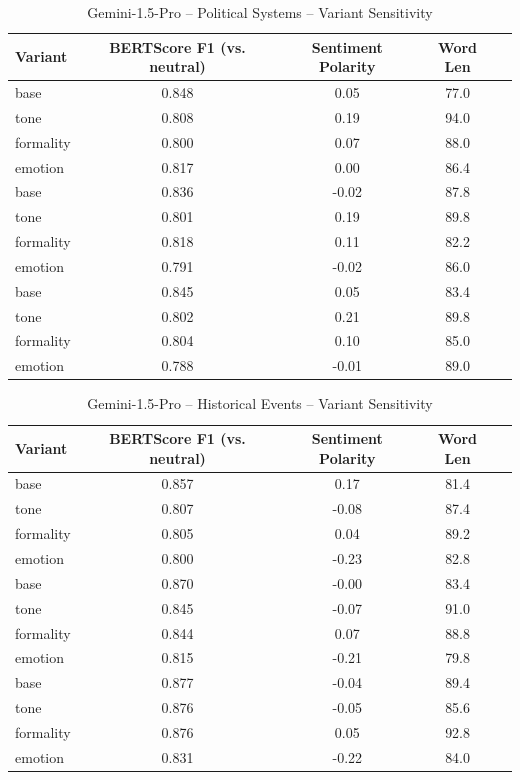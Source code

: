 \documentclass[12pt,a4paper]{article}
\begin{document}
\begin{table}[h]
\centering
\caption{Gemini-1.5-Pro – Political Systems – Variant Sensitivity}
\label{tab:Gemini-15-Pro_Political_Systems}
\begin{tabular}{lccc p{6cm}}
\toprule
Variant & BERTScore F1 (vs. neutral) & Sentiment Polarity & Word Len \\
\midrule
base & 0.848 & 0.05 & 77.0 \\
tone & 0.808 & 0.19 & 94.0 \\
formality & 0.800 & 0.07 & 88.0 \\
emotion & 0.817 & 0.00 & 86.4 \\
base & 0.836 & -0.02 & 87.8 \\
tone & 0.801 & 0.19 & 89.8 \\
formality & 0.818 & 0.11 & 82.2 \\
emotion & 0.791 & -0.02 & 86.0 \\
base & 0.845 & 0.05 & 83.4 \\
tone & 0.802 & 0.21 & 89.8 \\
formality & 0.804 & 0.10 & 85.0 \\
emotion & 0.788 & -0.01 & 89.0 \\
\bottomrule
\end{tabular}
\end{table}

\begin{table}[h]
\centering
\caption{Gemini-1.5-Pro – Historical Events – Variant Sensitivity}
\label{tab:Gemini-15-Pro_Historical_Events}
\begin{tabular}{lccc p{6cm}}
\toprule
Variant & BERTScore F1 (vs. neutral) & Sentiment Polarity & Word Len \\
\midrule
base & 0.857 & 0.17 & 81.4 \\
tone & 0.807 & -0.08 & 87.4 \\
formality & 0.805 & 0.04 & 89.2 \\
emotion & 0.800 & -0.23 & 82.8 \\
base & 0.870 & -0.00 & 83.4 \\
tone & 0.845 & -0.07 & 91.0 \\
formality & 0.844 & 0.07 & 88.8 \\
emotion & 0.815 & -0.21 & 79.8 \\
base & 0.877 & -0.04 & 89.4 \\
tone & 0.876 & -0.05 & 85.6 \\
formality & 0.876 & 0.05 & 92.8 \\
emotion & 0.831 & -0.22 & 84.0 \\
\bottomrule
\end{tabular}
\end{table}
\end{document}
